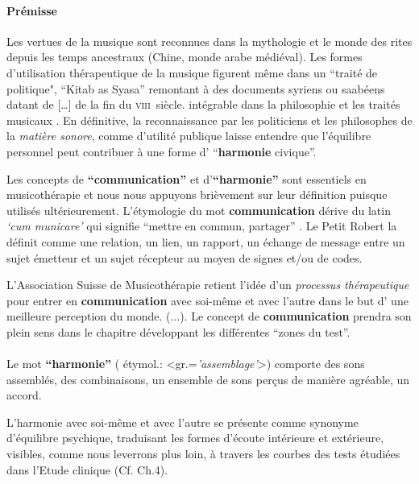 \paragraph{Prémisse}

Les vertues de la musique sont reconnues dans la mythologie et le
monde des rites depuis les temps ancestraux (Chine, monde arabe
médiéval).
Les formes d'utilisation
thérapeutique de la musique figurent même dans un ``traité de politique",
``Kitab as Syasa'' remontant à des documents syriens ou saabéens datant de  [\dots] de la fin du
\textsc{viii}\ieme\ siècle.   intégrable dans la
philosophie et les traités musicaux \autocite[ch. III, p.
96]{vrait_musicotherapie_2018}.
En définitive, la reconnaissance par les  politiciens  et les
philosophes de la \textit{matière sonore}, comme d'utilité
publique laisse entendre que l'équilibre personnel
peut contribuer à une forme d' ``\textbf{harmonie }civique''.




Les concepts de \textbf{``communication''} et  d'\textbf{``harmonie''}
sont essentiels en
musicothérapie et nous nous appuyons brièvement
sur leur définition puisque utilisés ultérieurement.
L'étymologie du mot  \textbf{communication} dérive du latin  \textit{`cum
  municare'} qui signifie ``mettre en commun, partager'' \autocite{dicpetitrobert}.
Le Petit Robert la définit comme une
relation, un lien, un rapport, un échange de message entre un sujet émetteur et un
sujet récepteur au moyen de signes et/ou de codes.

L'Association Suisse
de Musicothérapie retient l'idée d'un\textit{ processus thérapeutique }pour entrer en \textbf{communication} avec soi-même et avec
l'autre dans le but d' une meilleure perception du
monde. (...)\autocite{site_musitherapy}.
Le concept de \textbf{communication} prendra son plein sens
dans le chapitre développant les différentes ``zones du test''.
\paragraph{}
Le mot \textbf{``harmonie''} ( étymol.:
<gr.=\textit{'assemblage'}>) comporte
 des sons assemblés, des combinaisons, un ensemble de sons perçus de
 manière agréable, un accord.

 L'harmonie avec soi-même et avec l'autre se présente comme  synonyme d'équilibre
psychique, traduisant les formes d'écoute intérieure et
extérieure,  visibles, comme nous leverrons plus loin, à travers les courbes des tests étudiées
dans l'Etude clinique (Cf. Ch.4).



